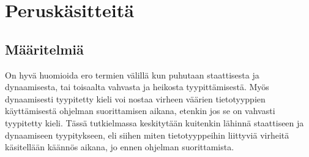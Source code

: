 \section{Peruskäsitteitä}
\subsection{Määritelmiä}

On hyvä huomioida ero termien välillä kun puhutaan staattisesta ja
dynaamisesta, tai toisaalta vahvasta ja heikosta tyypittämisestä. Myös
dynaamisesti tyypitetty kieli voi nostaa virheen väärien tietotyyppien
käyttämisestä ohjelman suorittamisen aikana, etenkin jos se on vahvasti
tyypitetty kieli. Tässä tutkielmassa keskitytään kuitenkin lähinnä
staattiseen ja dynaamiseen tyypitykseen, eli siihen miten tietotyyppeihin
liittyviä virheitä käsitellään käännös aikana, jo ennen ohjelman
suorittamista.